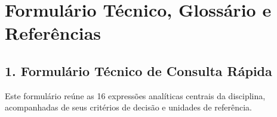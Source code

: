 
\cleardoublepage
{}
{}
\chapter*{Formulário Técnico, Glossário e Referências}

\section*{1. Formulário Técnico de Consulta Rápida}

Este formulário reúne as 16 expressões analíticas centrais da disciplina, acompanhadas de seus critérios de decisão e unidades de referência.

